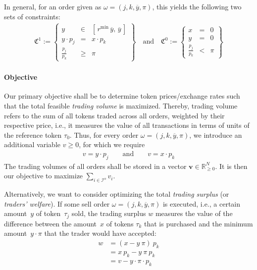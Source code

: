 \documentclass[11pt,parskip=full]{scrartcl}%
\newcommand*{\ie}{i.e., }
\newcommand*{\Min}{\mathrm{min}}
\newcommand*{\iorders}{\mathcal{I}^o}       %
\begin{document}
In general, for an order given as $ \omega = (j,k,\overline{y},\pi) $, this yields
the following two sets of constraints:
\begin{align}
  \mathfrak{C}^1 := \left\{
  \begin{array}{rll}
    y &\in & [\, r^\Min \, \overline{y}, \, \overline{y}\,] \\
    y \cdot p_j &= & x \cdot p_k \\[1mm]
    \frac{p_j}{p_k} &\ge & \pi
  \end{array}
  \right\}
  \quad
  \text{and}
  \quad
  \mathfrak{C}^0 := \left\{
  \begin{array}{rll}
    x &= & 0 \\
    y &= & 0 \\[1mm]
    \frac{p_j}{p_k} &< & \pi
  \end{array}
  \right\}
  \label{eq:order_model_generic}
\end{align}

\paragraph{Objective}

Our primary objective shall be to determine token prices/exchange rates such that the total
feasible \emph{trading volume} is maximized.
Thereby, trading volume refers to the sum of all tokens traded across all orders, weighted by their
respective price, \ie it measures the value of all transactions in terms of units of the reference
token $ \tau_0 $.
Thus, for every order $ \omega = (j,k,\overline{y},\pi) $, we introduce an additional
variable $ v \ge 0 $, for which we require
\begin{align}
  v = y \cdot p_j \qquad \text{and} \qquad v = x \cdot p_k
  \label{eq:trading_volume}
\end{align}
The trading volumes of all orders shall be stored in a vector
$ \mathbf{v} \in \mathbb{R}^N_{\ge 0} $.
It is then our objective to maximize $ \sum_{i \in \iorders} v_i $.

Alternatively, we want to consider optimizing the total \emph{trading surplus}
(or \emph{traders' welfare}).
If some sell order $ \omega = (j,k,\overline{y},\pi) $ is executed, \ie a certain amount~$ y $
of token~$ \tau_j $ sold, the trading surplus $ w $ measures the value of the difference between
the amount~$ x $ of tokens $ \tau_k $ that is purchased and the minimum amount~$ y \cdot \pi $ that
the trader would have accepted:
\begin{align}
  w &= ( x - y \> \pi ) \> p_k \\
    &= x \> p_k - y \> \pi \> p_k \\
    &= v -  y \cdot \pi \cdot p_k
  \label{eq:trading_surplus}
\end{align}
\end{document}
